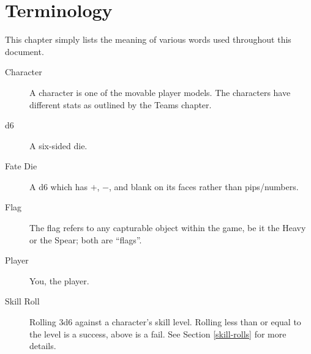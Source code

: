 \chapter{Terminology}
This chapter simply lists the meaning of various words used throughout this document.

\begin{description}
\item[Character] A character is one of the movable player models. The characters have different stats as outlined by the Teams chapter.
\item[d6] A six-sided die.
\item[Fate Die] A d6 which has $+$, $-$, and blank on its faces rather than pips/numbers.
\item[Flag] The flag refers to any capturable object within the game, be it the Heavy or the Spear; both are ``flags''.
\item[Player] You, the player.
\item[Skill Roll] Rolling 3d6 against a character's skill level. Rolling less than or equal to the level is a success, above is a fail. See Section \ref{skill-rolls} for more details.
\end{description}